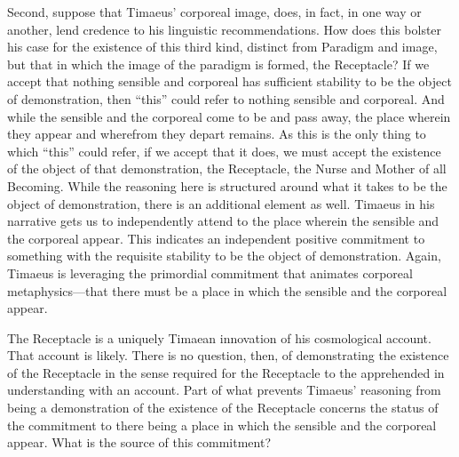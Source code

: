 Second, suppose that Timaeus' corporeal image, does, in fact, in one way or another, lend credence to his linguistic recommendations. How does this bolster his case for the existence of this third kind, distinct from Paradigm and image, but that in which the image of the paradigm is formed, the Receptacle? If we accept that nothing sensible and corporeal has sufficient stability to be the object of demonstration, then ``this'' could refer to nothing sensible and corporeal. And while the sensible and the corporeal come to be and pass away, the place wherein they appear and wherefrom they depart remains. As this is the only thing to which ``this'' could refer, if we accept that it does, we must accept the existence of the object of that demonstration, the Receptacle, the Nurse and Mother of all Becoming. While the reasoning here is structured around what it takes to be the object of demonstration, there is an additional element as well. Timaeus in his narrative gets us to independently attend to the place wherein the sensible and the corporeal appear. This indicates an independent positive commitment to something with the requisite stability to be the object of demonstration. Again, Timaeus is leveraging the primordial commitment that animates corporeal metaphysics---that there must be a place in which the sensible and the corporeal appear.

The Receptacle is a uniquely Timaean innovation of his cosmological account. That account is likely. There is no question, then, of demonstrating the existence of the Receptacle in the sense required for the Receptacle to the apprehended in understanding with an account. Part of what prevents Timaeus' reasoning from being a demonstration of the existence of the Receptacle concerns the status of the commitment to there being a place in which the sensible and the corporeal appear. What is the source of this commitment? 

